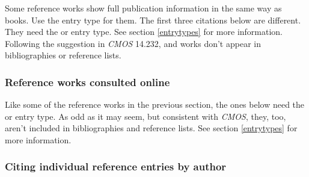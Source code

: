 \documentclass[11pt,letterpaper,oneside]{article}
\begin{document}
Some reference works show full publication information in the same way
as books. Use the  entry type for them. The first three
citations below are different. They need the  or
 entry type. See section \ref{entrytypes} for
more information. Following the suggestion in \textit{CMOS} 14.232,
 and  works don't appear in
bibliographies or reference lists.

\begin{citebib}
\item \cite{salvation1980}
\item \cite{hootananny2009}
\item \cite{dab1937}
\item \cite[s.vv. \mkbibquote{police ranks}, \mkbibquote{postal addresses}]{timestyle2003}
\item \cite[6.8.2]{mla2008}
\end{citebib}

\subsubsection{Reference works consulted online}
\label{14.233}

Like some of the reference works in the previous section, the ones
below need the  or  entry
type. As odd as it may seem, but consistent with \textit{CMOS}, they,
too, aren't included in bibliographies and reference lists. See
section \ref{entrytypes} for more information.

\begin{citeonly}
\item \cite{toscanini2016}
\item \cite{cairns2016}
\item \cite{wikipedia2016}
\item \cite{merriam2016}
\end{citeonly}

\subsubsection{Citing individual reference entries by author}

\begin{citebib}
\item \cite{isaacson2005}
\end{citebib}
\end{document}
